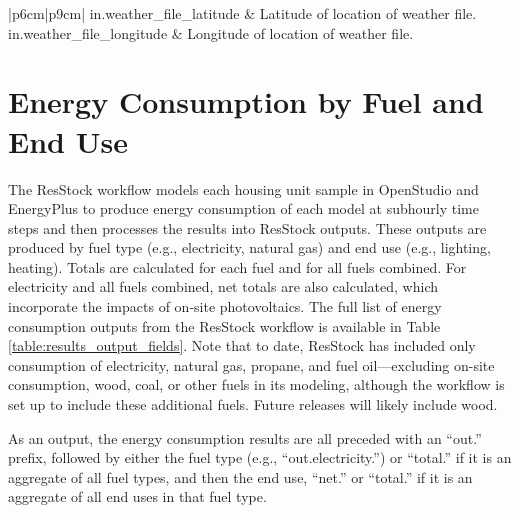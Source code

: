 \begin{customLongTable}{ |p{6cm}|p{9cm}| }
        in.weather\_file\_latitude & Latitude of location of weather file. \\ \hline
        in.weather\_file\_longitude & Longitude of location of weather file. \\ \hline
    \end{customLongTable}

\section{Energy Consumption by Fuel and End Use}
The ResStock workflow models each housing unit sample in OpenStudio and EnergyPlus to produce energy consumption of each model at subhourly time steps and then processes the results into ResStock outputs. These outputs are produced by fuel type (e.g., electricity, natural gas) and end use (e.g., lighting, heating). Totals are calculated for each fuel and for all fuels combined. For electricity and all fuels combined, net totals are also calculated, which incorporate the impacts of on-site photovoltaics. The full list of energy consumption outputs from the ResStock workflow is available in Table \ref{table:results_output_fields}. Note that to date, ResStock has included only consumption of electricity, natural gas, propane, and fuel oil---excluding on-site consumption, wood, coal, or other fuels in its modeling, although the workflow is set up to include these additional fuels. Future releases will likely include wood. 

As an output, the energy consumption results are all preceded with an ``out.'' prefix, followed by either the fuel type (e.g., ``out.electricity.'') or ``total.'' if it is an aggregate of all fuel types, and then the end use, ``net.''  or ``total.'' if it is an aggregate of all end uses in that fuel type.

